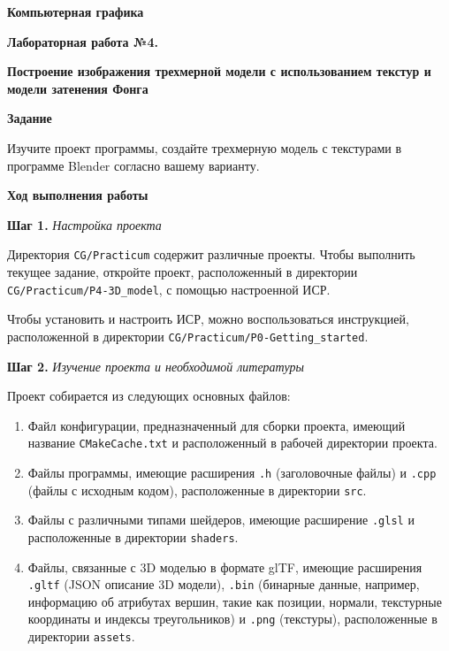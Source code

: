 \documentclass[a4paper,12pt]{article}
\begin{document}
\fontsize{14pt}{16pt}\selectfont
\begin{center}
    \textbf{{\Large Компьютерная графика}}
    
    \textbf{{\large Лабораторная работа №4. }}
    
    \textbf{{\large Построение изображения трехмерной модели с использованием текстур и модели затенения Фонга}}
    \end{center}
    
    \textbf{Задание}
    
    Изучите проект программы, создайте трехмерную модель с текстурами в программе Blender согласно вашему варианту.
    
    \textbf{Ход выполнения работы}
    
    \textbf{Шаг 1.} \textit{Настройка проекта}
    
    Директория \texttt{CG/Practicum} содержит различные проекты. Чтобы выполнить текущее задание, откройте проект, расположенный в директории \\
     \texttt{CG/Practicum/P4-3D\_model}, с помощью настроенной ИСР.
    
    Чтобы установить и настроить ИСР, можно воспользоваться инструкцией, расположенной в директории \texttt{CG/Practicum/P0-Getting\_started}.
    
    \textbf{Шаг 2.} \textit{Изучение проекта и необходимой литературы}
    
    Проект собирается из следующих основных файлов:
    
    \begin{enumerate}
        \item Файл конфигурации, предназначенный для сборки проекта, имеющий название \texttt{CMakeCache.txt} и расположенный в рабочей директории проекта.
        \item Файлы программы, имеющие расширения \texttt{.h} (заголовочные файлы) и \texttt{.cpp} (файлы с исходным кодом), расположенные в директории \texttt{src}.
        \item Файлы с различными типами шейдеров, имеющие расширение \texttt{.glsl} и расположенные в директории \texttt{shaders}.
        \item Файлы, связанные с 3D моделью в формате glTF, имеющие расширения \texttt{.gltf} (JSON описание 3D модели), \texttt{.bin} (бинарные данные, например, информацию об атрибутах вершин, такие как позиции, нормали, текстурные координаты и индексы треугольников) и \texttt{.png} (текстуры), расположенные в директории \texttt{assets}.
    \end{enumerate}
    
\end{document}

